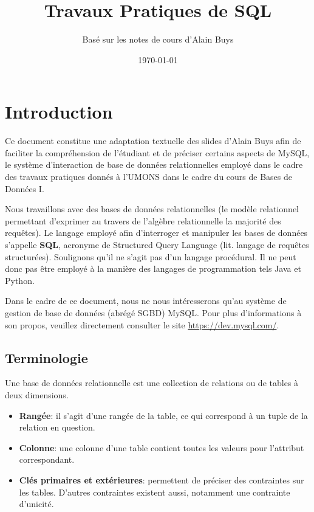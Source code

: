 \documentclass[a4paper, 12pt]{report}
\title{Travaux Pratiques de SQL}
\author{Basé sur les notes de cours d'Alain Buys}
\date{\today}
\theoremstyle{definition} \newtheorem{ex}{Exemple}
\begin{document}
\maketitle
\tableofcontents
\chapter{Introduction}
Ce document constitue une adaptation textuelle des slides d'Alain Buys afin de faciliter la compréhension de l'étudiant et de préciser certains aspects de MySQL, le système d'interaction de base de données relationnelles employé dans le cadre des travaux pratiques donnés à l'UMONS dans le cadre du cours de Bases de Données I.

Nous travaillons avec des bases de données relationnelles (le modèle relationnel permettant d'exprimer au travers de l'algèbre relationnelle la majorité des requêtes). Le langage employé afin d'interroger et manipuler les bases de données s'appelle \textbf{SQL}, acronyme de Structured Query Language (lit. langage de requêtes structurées). Soulignons qu'il ne s'agit pas d'un langage procédural. Il ne peut donc pas être employé à la manière des langages de programmation tels Java et Python.

Dans le cadre de ce document, nous ne nous intéresserons qu'au système de gestion de base de données (abrégé SGBD) MySQL. Pour plus d'informations à son propos, veuillez directement consulter le site \url{https://dev.mysql.com/}.

\section{Terminologie}
Une base de données relationnelle est une collection de relations ou de tables à deux dimensions.
\begin{itemize}
\item \textbf{Rangée}: il s'agit d'une rangée de la table, ce qui correspond à un tuple de la relation en question.
\item \textbf{Colonne}: une colonne d'une table contient toutes les valeurs pour l'attribut correspondant.
\item \textbf{Clés primaires et extérieures}: permettent de préciser des contraintes sur les tables. D'autres contraintes existent aussi, notamment une contrainte d'unicité.
\end{itemize}
\end{document}
